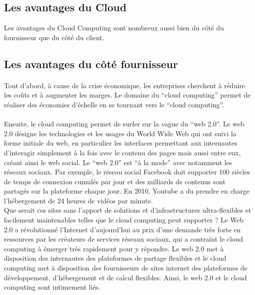 \documentclass[a4paper,12pt]{report}
\begin{document}
\begin{onehalfspace}
	\section{Les avantages du Cloud}
	
	Les avantages du Cloud Computing sont nombreux aussi bien du côté du fournisseur que du côté du client.
	
	\subsection{Les avantages du côté fournisseur}
	
	\paragraph*{}
	Tout d’abord, à cause de la crise économique, les entreprises cherchent à réduire les coûts et à augmenter les marges. Le domaine du “cloud computing” permet de réaliser des économies d’échelle en se tournant vers le “cloud computing”.

	\paragraph*{}
	Ensuite, le cloud computing permet de surfer sur la vague du “web 2.0”. Le web 2.0 désigne les technologies et les usages du World Wide Web qui ont suivi la forme initiale du web, en particulier les interfaces permettant aux internautes d'interagir simplement à la fois avec le contenu des pages mais aussi entre eux, créant ainsi le web social. Le “web 2.0” est “à la mode” avec notamment les réseaux sociaux. Par exemple, le réseau social Facebook doit supporter 100 siècles de temps de connexion cumulés par jour et des milliards de contenus sont partagés sur la plateforme chaque jour. En 2010, Youtube a du prendre en charge l’hébergement de 24 heures de vidéos par minute.\\
Que serait ces sites sans l’apport de solutions et d’infrastructures ultra-flexibles et facilement maintenables telles que le cloud computing peut supporter ? Le Web 2.0 a révolutionné l’Internet d’aujourd’hui au prix d’une demande très forte en ressources par les créateurs de services réseaux sociaux, qui a contraint le cloud computing à émerger très rapidement pour y répondre. Le web 2.0 met à disposition des internautes des plateformes de partage flexibles et le cloud computing met à disposition des fournisseurs de sites internet des plateformes de développement, d’hébergement et de calcul flexibles. Ainsi, le web 2.0 et le cloud computing sont intimement liés.
	

\end{onehalfspace}
\end{document}
